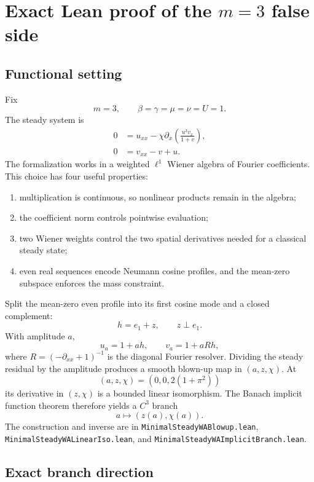 \documentclass[11pt]{article}
\newcommand{\code}[1]{\nolinkurl{#1}}
\begin{document}
\section{Exact Lean proof of the \(m=3\) false side}

\subsection{Functional setting}

Fix
\[
  m=3,\qquad \beta=\gamma=\mu=\nu=U=1.
\]
The steady system is
\begin{align}
 0&=u_{xx}-\chi\partial_x\left(\frac{u^3v_x}{1+v}\right),
                                                               \label{eq:m3u}\\
 0&=v_{xx}-v+u.                                                \label{eq:m3v}
\end{align}
The formalization works in a weighted \(\ell^1\) Wiener algebra of Fourier
coefficients.  This choice has four useful properties:
\begin{enumerate}[leftmargin=2em]
\item multiplication is continuous, so nonlinear products remain in the
  algebra;
\item the coefficient norm controls pointwise evaluation;
\item two Wiener weights control the two spatial derivatives needed for a
  classical steady state;
\item even real sequences encode Neumann cosine profiles, and the mean-zero
  subspace enforces the mass constraint.
\end{enumerate}

Split the mean-zero even profile into its first cosine mode and a closed
complement:
\[
  h=e_1+z,\qquad z\perp e_1.
\]
With amplitude \(a\),
\[
  u_a=1+ah,\qquad v_a=1+aRh,
\]
where \(R=(-\partial_{xx}+1)^{-1}\) is the diagonal Fourier resolver.
Dividing the steady residual by the amplitude produces a smooth blown-up
map in \((a,z,\chi)\).  At
\[
  (a,z,\chi)=(0,0,2(1+\pi^2))
\]
its derivative in \((z,\chi)\) is a bounded linear isomorphism.  The Banach
implicit function theorem therefore yields a \(C^3\) branch
\[
  a\longmapsto(z(a),\chi(a)).
\]
The construction and inverse are in
\code{MinimalSteadyWABlowup.lean},
\code{MinimalSteadyWALinearIso.lean}, and
\code{MinimalSteadyWAImplicitBranch.lean}.

\subsection{Exact branch direction}
\end{document}
